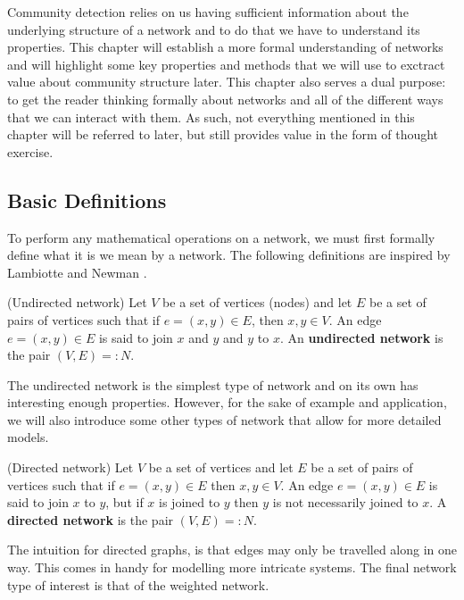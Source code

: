 Community detection relies on us having sufficient information about the underlying structure of a network and to do that we have to understand its properties. This chapter will establish a more formal understanding of networks and will highlight some key properties and methods that we will use to exctract value about community structure later. This chapter also serves a dual purpose: to get the reader thinking formally about networks and all of the different ways that we can interact with them. As such, not everything mentioned in this chapter will be referred to later, but still provides value in the form of thought exercise.

\subsection{Basic Definitions}
To perform any mathematical operations on a network, we must first formally define what it is we mean by a network. The following definitions are inspired by Lambiotte \cite{oxford:renaud_notes} and Newman \cite{newman10}.

\begin{definition}{(Undirected network)}
    Let $V$ be a set of vertices (nodes) and let $E$ be a set of pairs of vertices such that if $e = (x, y) \in E$, then $x, y \in V$. An edge $e = (x, y) \in E$ is said to join $x$ and $y$ and $y$ to $x$. An \textbf{undirected network} is the pair $(V, E) =: N$.\label{def:undirected_network}
\end{definition}

The undirected network is the simplest type of network and on its own has interesting enough properties. However, for the sake of example and application, we will also introduce some other types of network that allow for more detailed models.

\begin{definition}{(Directed network)}
    Let $V$ be a set of vertices and let $E$ be a set of pairs of vertices such that if $e = (x, y) \in E$ then $x, y \in V$. An edge $e = (x, y) \in E$ is said to join $x$ to $y$, but if $x$ is joined to $y$ then $y$ is not necessarily joined to $x$. A \textbf{directed network} is the pair $(V, E) =: N$.\label{def:directed_network}
\end{definition}

The intuition for directed graphs, is that edges may only be travelled along in one way. This comes in handy for modelling more intricate systems. The final network type of interest is that of the weighted network.

